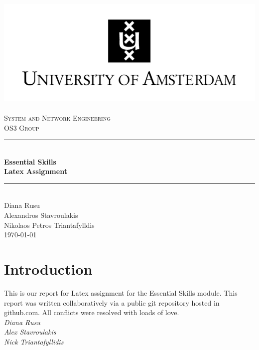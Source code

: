 \documentclass[a4paper,11pt]{report}
\newcommand{\HRule}{\rule{\linewidth}{0.5mm}}
\begin{document}
\begin{titlepage}

\begin{center}

\includegraphics{images/UvA-logo-2a.png}~\\[1cm]

\textsc{\LARGE System and Network Engineering\\ OS3 Group}\\[1.5cm]

\HRule \\

{ \huge \bfseries Essential Skills\\Latex Assignment}

\HRule \\[1cm]

\large{Diana Rusu} \\
\large{Alexandros Stavroulakis}\\
\large{Nikolaos Petros Triantafylldis}\\[11cm]

\today
\end{center}
\end{titlepage}

\tableofcontents

\listoffigures

\listoftables

\chapter* {Introduction}

This is our report for Latex assignment for the Essential Skills module. This report was written collaboratively via a public git repository hosted in github.com. All conflicts were resolved with loads of love. \\[0.5 cm]
\emph{Diana Rusu}\\
\emph{Alex Stavroulakis}\\
\emph{Nick Triantafyllidis}\\
\end{document}
